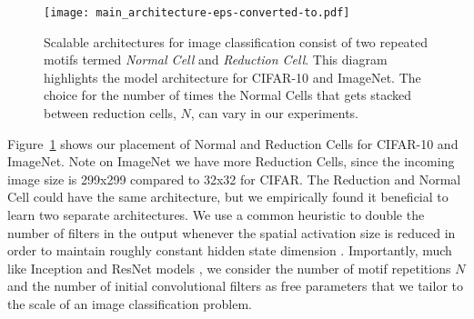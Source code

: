 \documentclass[10pt,twocolumn,letterpaper]{article}
\begin{document}
\begin{figure}[t!]
\begin{center}
\texttt{[image: main\_architecture-eps-converted-to.pdf]}
\caption{Scalable architectures for image classification consist of two repeated motifs termed {\it Normal Cell} and {\it Reduction Cell}. This diagram highlights the model architecture for CIFAR-10 and  ImageNet. The choice for the number of times the Normal Cells that gets stacked between reduction cells, $N$, can vary in our experiments.}
\label{figure:mainnet}
\end{center}
\end{figure}

Figure~\ref{figure:mainnet} shows our placement of Normal and Reduction Cells for CIFAR-10 and ImageNet. Note on ImageNet we have more Reduction Cells, since the incoming image size is 299x299 compared to 32x32 for CIFAR. The Reduction and Normal Cell could have the same architecture, but we empirically found it beneficial to learn two separate architectures.
We use a common heuristic to double the number of filters in the output whenever the spatial activation size is reduced in order to maintain roughly constant hidden state dimension \cite{krizhevsky2012imagenet,simonyan2014very}.
Importantly,
much like Inception and ResNet models \cite{szegedy2015going,he2015deep,szegedy2016rethinking,szegedy2016inception},
we consider the number of motif repetitions $N$ and the number of initial convolutional filters as free parameters that we tailor to the scale of an image classification problem.
\end{document}
